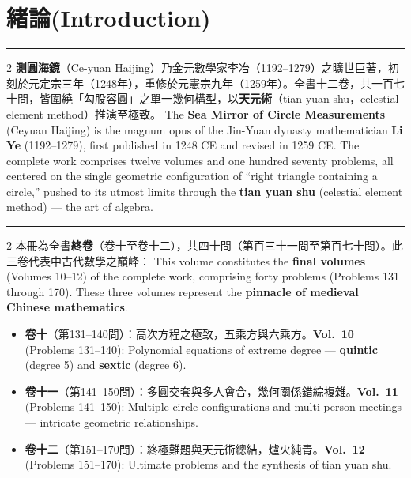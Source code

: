 \documentclass[11pt,a4paper]{article}
\newcommand{\longline}{\noindent\rule{\textwidth}{0.4pt}}
\newcommand{\bcn}{\begin{paracol}{2}}
\newcommand{\ecn}{\end{paracol}}
\newcommand{\sw}{\switchcolumn}
\newcommand{\bilingualsection}[2]{\section*{#1\quad(#2)}}
\begin{document}
\tableofcontents
\newpage

\bilingualsection{緒論}{Introduction}

\longline

\bcn
\textbf{測圓海鏡}（Ce-yuan Haijing）乃金元數學家李冶（1192--1279）之曠世巨著，初刻於元定宗三年（1248年），重修於元憲宗九年（1259年）。全書十二卷，共一百七十問，皆圍繞「勾股容圓」之單一幾何構型，以\textbf{天元術}（tian yuan shu，celestial element method）推演至極致。
\sw
The \textbf{Sea Mirror of Circle Measurements} (Ceyuan Haijing) is the magnum opus of the Jin-Yuan dynasty mathematician \textbf{Li Ye} (1192--1279), first published in 1248 CE and revised in 1259 CE. The complete work comprises twelve volumes and one hundred seventy problems, all centered on the single geometric configuration of ``right triangle containing a circle,'' pushed to its utmost limits through the \textbf{tian yuan shu} (celestial element method) --- the art of algebra.
\ecn

\longline

\vspace{0.3cm}

\bcn
本冊為全書\textbf{終卷}（卷十至卷十二），共四十問（第百三十一問至第百七十問）。此三卷代表中古代數學之巔峰：
\sw
This volume constitutes the \textbf{final volumes} (Volumes 10--12) of the complete work, comprising forty problems (Problems 131 through 170). These three volumes represent the \textbf{pinnacle of medieval Chinese mathematics}.
\ecn

\vspace{0.3cm}

\begin{itemize}[leftmargin=2em]
  \item \textbf{卷十}（第131--140問）：高次方程之極致，五乘方與六乘方。\quad\textbf{Vol.\ 10} (Problems 131--140): Polynomial equations of extreme degree --- \textbf{quintic} (degree 5) and \textbf{sextic} (degree 6).
  \item \textbf{卷十一}（第141--150問）：多圓交套與多人會合，幾何關係錯綜複雜。\quad\textbf{Vol.\ 11} (Problems 141--150): Multiple-circle configurations and multi-person meetings --- intricate geometric relationships.
  \item \textbf{卷十二}（第151--170問）：終極難題與天元術總結，爐火純青。\quad\textbf{Vol.\ 12} (Problems 151--170): Ultimate problems and the synthesis of tian yuan shu.
\end{itemize}
\end{document}
